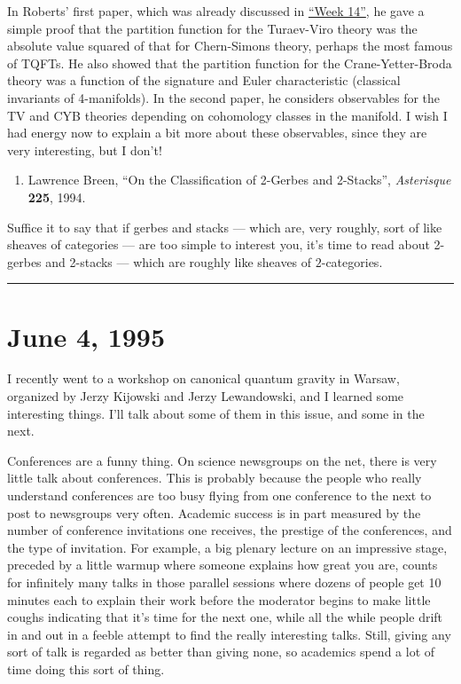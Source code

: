 \documentclass{article}
\def\tightlist{}
\begin{document}
In Roberts' first paper, which was already discussed in
\protect\hyperlink{week14}{``Week 14''}, he gave a simple proof that the
partition function for the Turaev-Viro theory was the absolute value
squared of that for Chern-Simons theory, perhaps the most famous of
TQFTs. He also showed that the partition function for the
Crane-Yetter-Broda theory was a function of the signature and Euler
characteristic (classical invariants of 4-manifolds). In the second
paper, he considers observables for the TV and CYB theories depending on
cohomology classes in the manifold. I wish I had energy now to explain a
bit more about these observables, since they are very interesting, but I
don't!

\begin{enumerate}
\def\labelenumi{\arabic{enumi})}
\setcounter{enumi}{5}
\tightlist
\item
  Lawrence Breen, ``On the Classification of 2-Gerbes and 2-Stacks'',
  \emph{Asterisque} \textbf{225}, 1994.
\end{enumerate}

Suffice it to say that if gerbes and stacks --- which are, very roughly,
sort of like sheaves of categories --- are too simple to interest you,
it's time to read about 2-gerbes and 2-stacks --- which are roughly like
sheaves of \(2\)-categories.

\begin{center}\rule{0.5\linewidth}{0.5pt}\end{center}



\hypertarget{week55}{%
\section{June 4, 1995}\label{week55}}

I recently went to a workshop on canonical quantum gravity in Warsaw,
organized by Jerzy Kijowski and Jerzy Lewandowski, and I learned some
interesting things. I'll talk about some of them in this issue, and some
in the next.

Conferences are a funny thing. On science newsgroups on the net, there
is very little talk about conferences. This is probably because the
people who really understand conferences are too busy flying from one
conference to the next to post to newsgroups very often. Academic
success is in part measured by the number of conference invitations one
receives, the prestige of the conferences, and the type of invitation.
For example, a big plenary lecture on an impressive stage, preceded by a
little warmup where someone explains how great you are, counts for
infinitely many talks in those parallel sessions where dozens of people
get 10 minutes each to explain their work before the moderator begins to
make little coughs indicating that it's time for the next one, while all
the while people drift in and out in a feeble attempt to find the really
interesting talks. Still, giving any sort of talk is regarded as better
than giving none, so academics spend a lot of time doing this sort of
thing.
\end{document}
